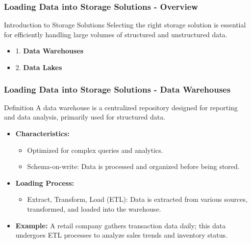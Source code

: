 \documentclass[aspectratio=169]{beamer}
\begin{document}
\begin{frame}[fragile]
    \frametitle{Loading Data into Storage Solutions - Overview}
    \begin{block}{Introduction to Storage Solutions}
        Selecting the right storage solution is essential for efficiently handling large volumes of structured and unstructured data.
    \end{block}
    \begin{itemize}
        \item 1. \textbf{Data Warehouses}
        \item 2. \textbf{Data Lakes}
    \end{itemize}
\end{frame}

\begin{frame}[fragile]
    \frametitle{Loading Data into Storage Solutions - Data Warehouses}
    \begin{block}{Definition}
        A data warehouse is a centralized repository designed for reporting and data analysis, primarily used for structured data.
    \end{block}
    \begin{itemize}
        \item \textbf{Characteristics:}
        \begin{itemize}
            \item Optimized for complex queries and analytics.
            \item Schema-on-write: Data is processed and organized before being stored.
        \end{itemize}
        \item \textbf{Loading Process:}
        \begin{itemize}
            \item Extract, Transform, Load (ETL): Data is extracted from various sources, transformed, and loaded into the warehouse.
        \end{itemize}
        \item \textbf{Example:}
        A retail company gathers transaction data daily; this data undergoes ETL processes to analyze sales trends and inventory status.
    \end{itemize}
\end{frame}
\end{document}
